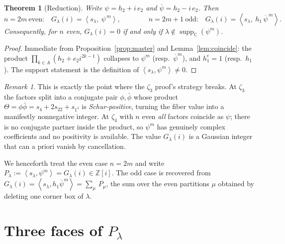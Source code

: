 \documentclass[11pt]{article}
\newtheorem{theorem}{Theorem}
\theoremstyle{definition}
\theoremstyle{remark}
\newtheorem{remark}{Remark}
\DeclareMathOperator{\supp}{supp}
\newcommand{\ZZ}{\mathbb{Z}}
\newcommand{\CC}{\mathbb{C}}
\newcommand{\la}{\lambda}
\newcommand{\inner}[1]{\left\langle #1 \right\rangle}
\newcommand{\psib}{\overline{\psi}}
\begin{document}
\begin{theorem}[Reduction]\label{thm:reduction}
Write $\psi=h_2+i\,e_2$ and $\psib=h_2-i\,e_2$. Then
\[
  n=2m\ \text{even:}\quad G_\la(i)=\inner{s_\la,\ \psi^{\,m}},
  \qquad\qquad
  n=2m+1\ \text{odd:}\quad G_\la(i)=\inner{s_\la,\ h_1\,\psib^{\,m}}.
\]
Consequently, for $n$ even, $G_\la(i)=0$ if and only if
$\la\notin\supp_\CC(\psi^m)$.
\end{theorem}

\begin{proof}
Immediate from Proposition~\ref{prop:master} and Lemma~\ref{lem:coincide}: the
product $\prod_{k\in A}(h_2+e_2 i^{2k-1})$ collapses to $\psi^{m}$ (resp.\
$\psib^{m}$), and $h_1^{e}=1$ (resp.\ $h_1$). The support statement is the
definition of $\inner{s_\la,\psi^m}\neq0$.
\end{proof}

\begin{remark}
This is exactly the point where the $\zeta_3$ proof's strategy breaks. At
$\zeta_3$ the factors split into a conjugate pair $\phi,\bar\phi$ whose product
$\Theta=\phi\bar\phi=s_4+2s_{22}+s_{1^4}$ is \emph{Schur-positive}, turning the
fiber value into a manifestly nonnegative integer. At $\zeta_4$ with $n$ even
\emph{all} factors coincide as $\psi$; there is no conjugate partner inside the
product, so $\psi^m$ has genuinely complex coefficients and no positivity is
available. The value $G_\la(i)$ is a Gaussian integer that can a priori vanish by
cancellation.
\end{remark}

\noindent We henceforth treat the even case $n=2m$ and write
$P_\la:=\inner{s_\la,\psi^m}=G_\la(i)\in\ZZ[i]$. The odd case is recovered from
$G_\la(i)=\inner{s_\la,h_1\psib^m}=\sum_{\mu}\,\overline{P_\mu}$, the sum over the
even partitions $\mu$ obtained by deleting one corner box of $\la$.

\section{Three faces of $P_\la$}
\end{document}
